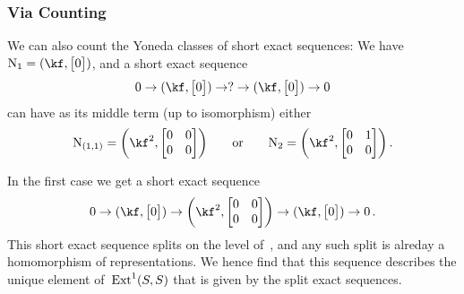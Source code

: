 \documentclass[a4paper,11pt]{scrartcl}
\begin{document}
\subsubsection{Via Counting}

We can also count the Yoneda classes of short exact sequences:
We have~$\Nil_1 = (\kf, \begin{bmatrix} 0 \end{bmatrix})$, and a short exact sequence
\[
  0
  \to
  (\kf, \begin{bmatrix} 0 \end{bmatrix})
  \to
  ?
  \to
  (\kf, \begin{bmatrix} 0 \end{bmatrix})
  \to
  0
\]
can have as its middle term (up to isomorphism) either
\[
  \Nil_{(1,1)}
  =
  \biggl( \kf^2, \begin{bmatrix} 0 & 0 \\ 0 & 0 \end{bmatrix} \biggr)
  \qquad\text{or}\qquad
  \Nil_2
  =
  \biggl( \kf^2, \begin{bmatrix} 0 & 1 \\ 0 & 0 \end{bmatrix} \biggr) \,.
\]

In the first case we get a short exact sequence
\[
  0
  \to
  (\kf, \begin{bmatrix} 0 \end{bmatrix})
  \to
  \biggl( \kf^2, \begin{bmatrix} 0 & 0 \\ 0 & 0 \end{bmatrix} \biggr)
  \to
  (\kf, \begin{bmatrix} 0 \end{bmatrix})
  \to
  0 \,.
\]
This short exact sequence splits on the level of~\vectorspaces{$\kf$}, and any such split is alreday a homomorphism of representations.
We hence find that this sequence describes the unique element of~$\operatorname{Ext}^1(S,S)$ that is given by the split exact sequences.
\end{document}
